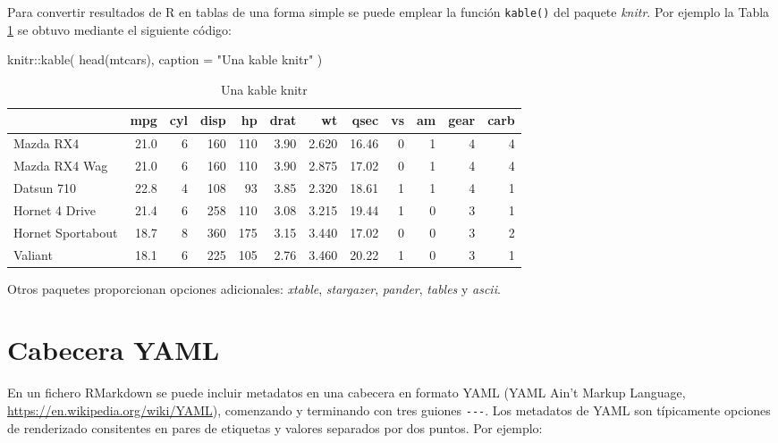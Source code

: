 \documentclass[
]{book}
\newenvironment{Shaded}{\begin{snugshade}}{\end{snugshade}}
\newcommand{\AttributeTok}[1]{\textcolor[rgb]{0.77,0.63,0.00}{#1}}
\newcommand{\FunctionTok}[1]{\textcolor[rgb]{0.00,0.00,0.00}{#1}}
\newcommand{\NormalTok}[1]{#1}
\newcommand{\SpecialCharTok}[1]{\textcolor[rgb]{0.00,0.00,0.00}{#1}}
\newcommand{\StringTok}[1]{\textcolor[rgb]{0.31,0.60,0.02}{#1}}
\theoremstyle{definition}
\theoremstyle{definition}
\theoremstyle{definition}
\theoremstyle{definition}
\theoremstyle{remark}
\begin{document}
Para convertir resultados de R en tablas de una forma simple se puede emplear la función \texttt{kable()} del paquete \emph{knitr}. Por ejemplo la Tabla \ref{tab:kable} se obtuvo mediante el siguiente código:

\begin{Shaded}
\begin{Highlighting}[]
\NormalTok{knitr}\SpecialCharTok{::}\FunctionTok{kable}\NormalTok{(}
  \FunctionTok{head}\NormalTok{(mtcars), }
  \AttributeTok{caption =} \StringTok{"Una kable knitr"}
\NormalTok{)}
\end{Highlighting}
\end{Shaded}

\begin{table}

\caption{\label{tab:kable}Una kable knitr}
\centering
\begin{tabular}[t]{l|r|r|r|r|r|r|r|r|r|r|r}
\hline
  & mpg & cyl & disp & hp & drat & wt & qsec & vs & am & gear & carb\\
\hline
Mazda RX4 & 21.0 & 6 & 160 & 110 & 3.90 & 2.620 & 16.46 & 0 & 1 & 4 & 4\\
\hline
Mazda RX4 Wag & 21.0 & 6 & 160 & 110 & 3.90 & 2.875 & 17.02 & 0 & 1 & 4 & 4\\
\hline
Datsun 710 & 22.8 & 4 & 108 & 93 & 3.85 & 2.320 & 18.61 & 1 & 1 & 4 & 1\\
\hline
Hornet 4 Drive & 21.4 & 6 & 258 & 110 & 3.08 & 3.215 & 19.44 & 1 & 0 & 3 & 1\\
\hline
Hornet Sportabout & 18.7 & 8 & 360 & 175 & 3.15 & 3.440 & 17.02 & 0 & 0 & 3 & 2\\
\hline
Valiant & 18.1 & 6 & 225 & 105 & 2.76 & 3.460 & 20.22 & 1 & 0 & 3 & 1\\
\hline
\end{tabular}
\end{table}

Otros paquetes proporcionan opciones adicionales: \emph{xtable}, \emph{stargazer}, \emph{pander}, \emph{tables} y \emph{ascii}.

\hypertarget{yaml}{%
\section{Cabecera YAML}\label{yaml}}

En un fichero RMarkdown se puede incluir metadatos en una cabecera en formato YAML
(YAML Ain't Markup Language, \url{https://en.wikipedia.org/wiki/YAML}),
comenzando y terminando con tres guiones \texttt{-\/-\/-}.
Los metadatos de YAML son típicamente opciones de renderizado consitentes en
pares de etiquetas y valores separados por dos puntos.
Por ejemplo:
\end{document}
